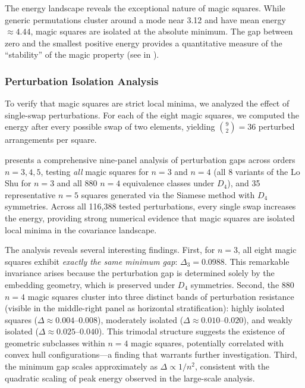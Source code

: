 The energy landscape reveals the exceptional nature of magic squares.
While generic permutations cluster around a mode near 3.12 and have mean energy $\approx 4.44$,
magic squares are isolated at the absolute minimum.
The gap between zero and the smallest positive energy provides a quantitative measure 
of the ``stability'' of the magic property
(see  in ).

\subsubsection{Perturbation Isolation Analysis}

To verify that magic squares are strict local minima, we analyzed the effect of single-swap perturbations.
For each of the eight magic squares, we computed the energy after every possible swap 
of two elements, yielding $\binom{9}{2} = 36$ perturbed arrangements per square.

 presents a comprehensive nine-panel analysis of perturbation gaps
across orders $n=3,4,5$, testing \emph{all} magic squares for $n=3$ and $n=4$
(all 8 variants of the Lo Shu for $n=3$ and all 880 $n=4$ equivalence classes under $D_4$),
and 35 representative $n=5$ squares generated via the Siamese method with $D_4$ symmetries.
Across all 116,388 tested perturbations, every single swap increases the energy,
providing strong numerical evidence that magic squares are isolated local minima in the covariance landscape.

The analysis reveals several interesting findings.
First, for $n=3$, all eight magic squares exhibit \emph{exactly the same minimum gap}:
$\Delta_3 = 0.0988$.
This remarkable invariance arises because the perturbation gap is determined solely 
by the embedding geometry, which is preserved under $D_4$ symmetries.
Second, the 880 $n=4$ magic squares cluster into three distinct bands of perturbation resistance
(visible in the middle-right panel as horizontal stratification):
highly isolated squares ($\Delta \approx 0.004$--$0.008$),
moderately isolated ($\Delta \approx 0.010$--$0.020$), 
and weakly isolated ($\Delta \approx 0.025$--$0.040$).
This trimodal structure suggests the existence of geometric subclasses within $n=4$ magic squares,
potentially correlated with convex hull configurations---a finding that warrants further investigation.
Third, the minimum gap scales approximately as $\Delta \propto 1/n^2$,
consistent with the quadratic scaling of peak energy observed in the large-scale analysis.

